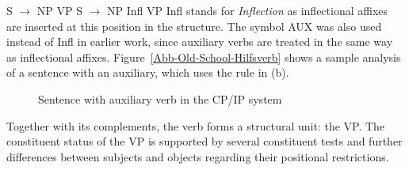 \eal
\ex S $\to$ NP VP
\ex S $\to$ NP Infl VP
\zl
%
Infl stands for \emph{Inflection} as inflectional affixes are inserted at this position in the
structure. The symbol AUX was also used instead
of Infl in earlier work, since auxiliary verbs are treated in the same way as inflectional
affixes. Figure~\vref{Abb-Old-School-Hilfsverb} shows a sample 
analysis of a sentence with an auxiliary, which uses the rule in (b). 
%
\begin{figure}
\begin{floatrow}
{\caption{\label{Abb-GB-Hilfsverb}Sentence with auxiliary verb in the CP/IP system}}
\end{floatrow}
\end{figure}%

Together with its complements, the verb forms a structural unit: the VP. The constituent status of
the VP is supported by several constituent tests and further differences
between subjects and objects regarding their positional restrictions.

